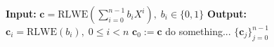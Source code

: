 \begin{algorithm}[ht!]
\caption{expandRlwe}
\label{alg:expand:bgv}
\begin{algorithmic}[1]
    \State \textbf{Input:} $\mathbf{c} = \mathrm{RLWE}(\sum_{i=0}^{n-1} b_i X^i),\;b_i\in\{0,1\}$
    \State \textbf{Output:} $\mathbf{c}_i = \mathrm{RLWE}(b_i),\; 0 \leq i < n$
    \State $\mathbf{c}_0 := \mathbf{c}$
        \State do something...
    \EndFor
    \State\Return $\{\mathbf{c}_j\}^{n-1}_{j=0}$
\end{algorithmic}
\end{algorithm}
